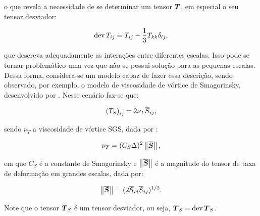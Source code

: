 \noindent o que revela a necessidade de se determinar um tensor $\boldsymbol{T}$, em especial o seu tensor desviador:

\begin{equation}
    \mathop{\mathrm{dev}}\nolimits{T_{ij}}=T_{ij}-\frac{1}{3}T_{kk}\delta_{ij}\text{,}
\end{equation}

\noindent que descreva adequadamente as interações entre diferentes escalas. Isso pode se tornar problemático uma vez que não se possui solução para as pequenas escalas. Dessa forma, considera-se um modelo capaz de fazer essa descrição, sendo observado, por exemplo, o modelo de viscosidade de vórtice de Smagorinsky, desenvolvido por . Nesse cenário faz-se que:

\begin{equation}
    \left({T_S}\right)_{ij}=2\nu_T\overline{S}_{ij}\text{,}
\end{equation}

\noindent sendo $\nu_T$ a viscosidade de vórtice SGS, dada por \cite{germano1991dynamic,piomelli1999large,hughes2000large,bailly2015turbulence,katopodes2019free}:

\begin{equation}
    \nu_T=(C_S\Delta)^2\left\lVert{\overline{\boldsymbol{S}}}\right\lVert\text{,}
\end{equation}

\noindent em que $C_S$ é a constante de Smagorinsky e $\left\lVert{\overline{\boldsymbol{S}}}\right\lVert$ é a magnitude do tensor de taxa de deformação em grandes escalas, dada por:

\begin{equation}
    \left\lVert{\overline{\boldsymbol{S}}}\right\lVert=(2\overline{S}_{ij}\overline{S}_{ij})^{1/2}\text{.}
\end{equation}

Note que o tensor $\boldsymbol{T}_S$ é um tensor desviador, ou seja, $\boldsymbol{T}_S=\mathop{\mathrm{dev}}\nolimits{\boldsymbol{T}_S}$.

%

